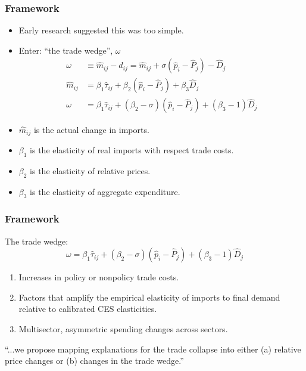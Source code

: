 \documentclass{beamer}
\begin{document}
\begin{frame}
  \frametitle{Framework}
  \begin{itemize}
  \item Early research suggested this was too simple.
  \item Enter: ``the trade wedge'', \(\omega\)
  \begin{align*}
    \omega &\equiv\hat{m}_{ij}-\hat{d}_{ij} = \hat{m}_{ij} + \sigma\left(\hat{p}_i-\hat{P}_j\right)-\hat{D}_j \\
    \hat{m}_{ij} &= \beta_1\hat{\tau}_{ij}+\beta_2\left(\hat{p}_i-\hat{P}_j\right) + \beta_3\hat{D}_j \\
    \omega &= \beta_1\hat{\tau}_{ij}+\left(\beta_2-\sigma\right)\left(\hat{p}_i-\hat{P}_j\right) + \left(\beta_3-1\right)\hat{D}_j
  \end{align*}
    \item \(\hat{m}_{ij} \) is the actual change in imports.
    \item \(\beta_1\) is the elasticity of real imports with respect trade costs.
    \item \(\beta_2\) is the elasticity of relative prices.
    \item \(\beta_3\) is the elasticity of aggregate expenditure.
  \end{itemize}
\end{frame}

\begin{frame}
  \frametitle{Framework}
  The trade wedge:
  \begin{equation*}
    \omega = \beta_1\hat{\tau}_{ij}+\left(\beta_2-\sigma\right)\left(\hat{p}_i-\hat{P}_j\right) + \left(\beta_3-1\right)\hat{D}_j
  \end{equation*}
  \begin{enumerate}
  \item Increases in policy or nonpolicy trade costs.
  \item Factors that amplify the empirical elasticity of imports to final demand relative to calibrated CES elasticities.
  \item Multisector, asymmetric spending changes across sectors.
  \end{enumerate}
  \begin{itemize*}
  \item ``...we propose mapping explanations for the trade collapse into either (a) relative price changes or (b) changes in the trade wedge.''
  \end{itemize*}
\end{frame}
\end{document}
